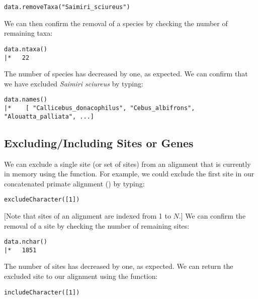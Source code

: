 {\tt \begin{snugshade*}
\begin{lstlisting}
data.removeTaxa("Saimiri_sciureus")
\end{lstlisting}
\end{snugshade*}}

We can then confirm the removal of a species by checking the number of remaining taxa:
{\tt \begin{snugshade*}
\begin{lstlisting}
data.ntaxa()
|*   22
\end{lstlisting}
\end{snugshade*}}
The number of species has decreased by one, as expected.
We can confirm that we have excluded \textit{Saimiri sciureus} by typing:
{\tt \begin{snugshade*}
\begin{lstlisting}
data.names()	
|*    [ "Callicebus_donacophilus", "Cebus_albifrons", "Alouatta_palliata", ...]
\end{lstlisting}
\end{snugshade*}}

\subsection{Excluding/Including Sites or Genes}
We can exclude a single site (or set of sites) from an alignment that is currently in memory using the  function.
For example, we could exclude the first site in our concatenated primate alignment () by typing:

{\tt \begin{snugshade*}
\begin{lstlisting}
excludeCharacter([1])
\end{lstlisting}
\end{snugshade*}}
[Note that sites of an alignment are indexed from 1 to $N$.]
We can confirm the removal of a site by checking the number of remaining sites:

{\tt \begin{snugshade*}
\begin{lstlisting}
data.nchar()
|*   1851
\end{lstlisting}
\end{snugshade*}}
The number of sites has decreased by one, as expected.
We can return the excluded site to our alignment using the  function:

{\tt \begin{snugshade*}
\begin{lstlisting}
includeCharacter([1])
\end{lstlisting}
\end{snugshade*}}

